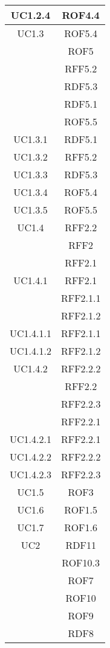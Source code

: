 \begin{longtable}{|c|c|}
\midrule
UC1.2.4
& ROF4.4\\

\midrule
UC1.3
& ROF5.4\\
& ROF5\\
& RFF5.2\\
& RDF5.3\\
& RDF5.1\\
& ROF5.5\\

\midrule
UC1.3.1
& RDF5.1\\

\midrule
UC1.3.2
& RFF5.2\\

\midrule
UC1.3.3
& RDF5.3\\

\midrule
UC1.3.4
& ROF5.4\\

\midrule
UC1.3.5
& ROF5.5\\

\midrule
UC1.4
& RFF2.2\\
& RFF2\\
& RFF2.1\\

\midrule
UC1.4.1
& RFF2.1\\
& RFF2.1.1\\
& RFF2.1.2\\

\midrule
UC1.4.1.1
& RFF2.1.1\\

\midrule
UC1.4.1.2
& RFF2.1.2\\

\midrule
UC1.4.2
& RFF2.2.2\\
& RFF2.2\\
& RFF2.2.3\\
& RFF2.2.1\\

\midrule
UC1.4.2.1
& RFF2.2.1\\

\midrule
UC1.4.2.2
& RFF2.2.2\\

\midrule
UC1.4.2.3
& RFF2.2.3\\

\midrule
UC1.5
& ROF3\\

\midrule
UC1.6
& ROF1.5\\

\midrule
UC1.7
& ROF1.6\\

\midrule
UC2
& RDF11\\
& ROF10.3\\
& ROF7\\
& ROF10\\
& ROF9\\
& RDF8\\


\end{longtable}
